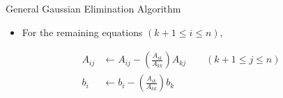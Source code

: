 \documentclass{beamer}
\newcommand{\beforeverb}{\footnotesize}
\newcommand{\afterverb}{\normalsize}
\begin{document}
\begin{frame}{General Gaussian Elimination Algorithm}
\begin{itemize}
\item  For the remaining equations $(k+1\le i \le n)$,
\end{itemize}
\beforeverb
\begin{align*}
A_{ij}&\leftarrow A_{ij}- \left(\frac{A_{ik}}{A_{kk}}\right)A_{kj}\quad \quad (k+1\le j\le n)\\
b_i &\leftarrow  b_i- \left(\frac{A_{ik}}{A_{kk}}\right)b_k
\end{align*}
\afterverb

\end{frame}
\end{document}
